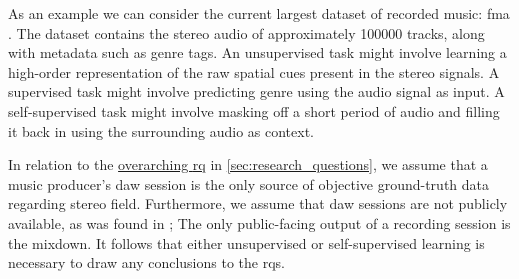 As an example we can consider the current largest dataset of recorded music: \gls{fma} \cite{defferrardFMADatasetMusic2017}. The dataset contains the stereo audio of approximately \num{100000} tracks, along with metadata such as genre tags. An unsupervised task might involve learning a high-order representation of the raw spatial cues present in the stereo signals. A supervised task might involve predicting genre using the audio signal as input. A self-supervised task might involve masking off a short period of audio and filling it back in using the surrounding audio as context. 

In relation to the \hyperref[sec:research_questions]{overarching \gls{rq}} in \cref{sec:research_questions}, we assume that a music producer's \gls{daw} session is the only source of objective ground-truth data regarding stereo field. Furthermore, we assume that \gls{daw} sessions are not publicly available, as was found in \cite{colonelReverseEngineeringRecording2021,rodriguezSpectralDynamicConstellations2024}; The only public-facing output of a recording session is the mixdown. It follows that either unsupervised or self-supervised learning is necessary to draw any conclusions to the \glspl{rq}.



